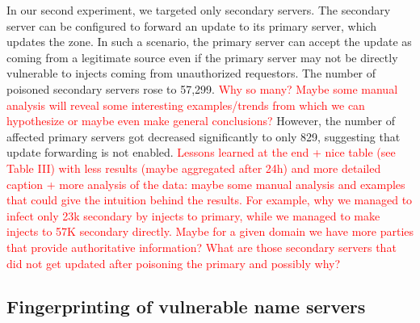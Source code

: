 In our second experiment, we targeted only secondary servers. 
The secondary server can be configured to forward an update to its primary server, which updates the zone. 
In such a scenario, the primary server can accept the update as coming from a legitimate source even if the primary server may not be directly vulnerable to injects coming from unauthorized requestors.  
The number of poisoned secondary servers rose to 57,299. 
\textcolor{red}{Why so many? Maybe some manual analysis will reveal some interesting examples/trends from which we can hypothesize or maybe even make general conclusions?}
However, the number of affected primary servers got decreased significantly to only 829, suggesting that update forwarding is not enabled. 
 \textcolor{red}{Lessons learned at the end + nice table (see Table III) with less results (maybe aggregated after 24h) and more detailed caption + more analysis of the data: maybe some manual analysis and examples that could give the intuition behind the results. For example, why we managed to infect only 23k secondary by injects to primary, while we managed to make injects to 57K secondary directly. Maybe for a given domain we have more parties that provide authoritative information? What are those secondary servers that did not get updated after poisoning the primary and possibly why?}


\subsection{Fingerprinting of vulnerable name servers}
